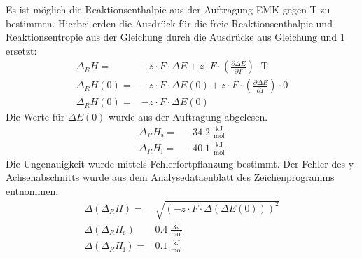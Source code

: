 \documentclass[12pt,a4paper,titlepage,headinclude,bibtotoc]{scrartcl}
\begin{document}
Es ist möglich die Reaktionsenthalpie aus der Auftragung EMK gegen T zu bestimmen. Hierbei erden die Ausdrück für die freie Reaktionsenthalpie und Reaktionsentropie aus der Gleichung  durch die Ausdrücke aus Gleichung und 1 ersetzt:
\begin{align}
\Delta_R H=&  - z\cdot F \cdot\Delta E +  z \cdot F \cdot (\frac{\partial \Delta E}{\partial T})\cdot\text{T} \\ 
\Delta_R H(0)=&  - z\cdot F\cdot \Delta E(0) +  z \cdot F \cdot (\frac{\partial \Delta E}{\partial T})\cdot 0\\ 
\Delta_R H(0)=&  - z\cdot F \cdot\Delta E(0)
\end{align}
Die Werte für $\Delta E(0)$ wurde aus der Auftragung abgelesen. 
\begin{align}
\Delta_R H_{\text{s}}=& -34.2\;\frac{\text{kJ}}{\text{mol}}\\
\Delta_R H_{\text{l}}=&  -40.1\;\frac{\text{kJ}}{\text{mol}}
\end{align}
Die Ungenauigkeit wurde mittels Fehlerfortpflanzung bestimmt. Der Fehler des y-Achsenabschnitts wurde aus dem Analysedataenblatt des Zeichenprogramms entnommen.
\begin{align}
\Delta(\Delta_R H)=& \sqrt{(- z\cdot F \cdot\Delta(\Delta E(0)))^2}\\
\Delta(\Delta_R H_{\text{s}})&  0.4\;\frac{\text{kJ}}{\text{mol}}\\
\Delta(\Delta_R H_{\text{l}})=&  0.1\;\frac{\text{kJ}}{\text{mol}}
\end{align}
\end{document}
